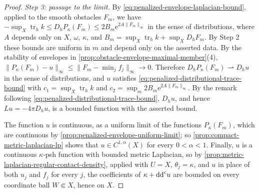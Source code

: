\begin{proof}
\emph{Step 3: passage to the limit.} By \eqref{eq:penalized-envelope-laplacian-bound}, applied to the smooth obstacles $F_m$, we have $-\sup_X\operatorname{tr}_hk\leq D_hP_\kappa(F_m)\leq2B_m\mathrm e^{2A\|F_m\|_\infty}$ in the sense of distributions, where $A$ depends only on $X$, $\omega$, $\kappa$, and $B_m=\sup_X\operatorname{tr}_hk+\sup_XD_hF_m$. By Step 2 these bounds are uniform in $m$ and depend only on the asserted data. By the stability of envelopes in \cref{prop:obstacle-envelope-maximal-member}(4), $\|P_\kappa(F_m)-u\|_\infty\leq\|F_m-\min_jf_j\|_\infty\to0$. Therefore $D_hP_\kappa(F_m)\rightharpoonup D_hu$ in the sense of distributions, and $u$ satisfies \eqref{eq:penalized-distributional-trace-bound} with $c_1=\sup_X\operatorname{tr}_hk$ and $c_2=\sup_m2B_m\mathrm e^{2A\|F_m\|_\infty}$. By the remark following \eqref{eq:penalized-distributional-trace-bound}, $D_hu$, and hence $Lu=-4\pi D_hu$, is a bounded function with the asserted bound.

The function $u$ is continuous, as a uniform limit of the functions $P_\kappa(F_m)$, which are continuous by \cref{prop:penalized-envelope-uniform-limit}; so \cref{prop:compact-metric-laplacian-lp} shows that $u\in C^{1,\alpha}(X)$ for every $0<\alpha<1$. Finally, $u$ is a continuous $\kappa$-psh function with bounded metric Laplacian, so by \cref{prop:metric-laplacian-regular-contact-density}, applied with $U=X$, $\theta_j=\kappa$, and $u$ in place of both $u_j$ and $f_j$ for every $j$, the coefficients of $\kappa+\mathrm{dd}^{\mathrm{c}} u$ are bounded on every coordinate ball $W\Subset X$, hence on $X$.
\end{proof}
